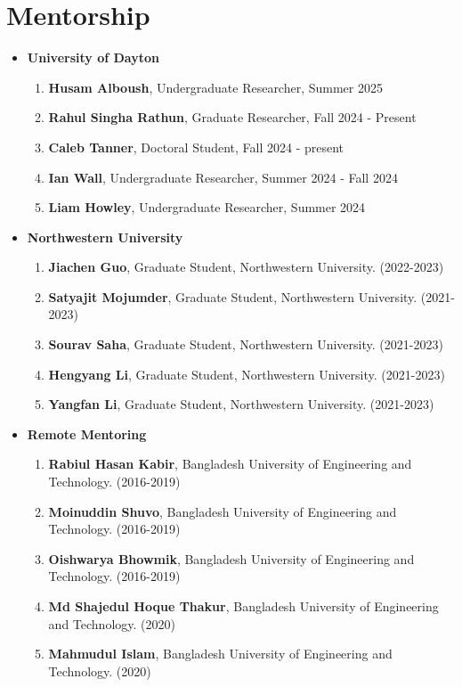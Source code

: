 \documentclass[11pt, letterpaper]{article}
\begin{document}
\section{Mentorship}
    \begin{itemize}[itemsep=-1pt, topsep=2pt]
        \item \textbf{University of Dayton}
        \begin{enumerate}[label=\arabic*., itemsep=-1pt, topsep=2pt]
            \item \textbf{Husam Alboush}, Undergraduate Researcher, Summer 2025
            \item \textbf{Rahul Singha Rathun}, Graduate Researcher, Fall 2024 - Present
            \item \textbf{Caleb Tanner}, Doctoral Student, Fall 2024 - present
            \item \textbf{Ian  Wall}, Undergraduate Researcher, Summer 2024 - Fall 2024
            \item \textbf{Liam Howley}, Undergraduate Researcher, Summer 2024
        \end{enumerate}
        \item \textbf{Northwestern University}
        \begin{enumerate}
            \item \textbf{Jiachen Guo}, Graduate Student, Northwestern University. (2022-2023)
            \item \textbf{Satyajit Mojumder}, Graduate Student, Northwestern University. (2021-2023)
            \item \textbf{Sourav Saha}, Graduate Student, Northwestern University. (2021-2023)
            \item \textbf{Hengyang Li}, Graduate Student, Northwestern University. (2021-2023)
            \item \textbf{Yangfan Li}, Graduate Student, Northwestern University. (2021-2023)
        \end{enumerate}
        \item \textbf{Remote Mentoring}
        \begin{enumerate}
            \item \textbf{Rabiul Hasan Kabir}, Bangladesh University of Engineering and Technology. (2016-2019)
            \item \textbf{Moinuddin Shuvo}, Bangladesh University of Engineering and Technology. (2016-2019)
            \item \textbf{Oishwarya Bhowmik}, Bangladesh University of Engineering and Technology. (2016-2019)
            \item \textbf{Md Shajedul Hoque Thakur}, Bangladesh University of Engineering and Technology. (2020)
            \item \textbf{Mahmudul Islam}, Bangladesh University of Engineering and Technology. (2020)
        \end{enumerate}
    \end{itemize}
    
\end{document}

